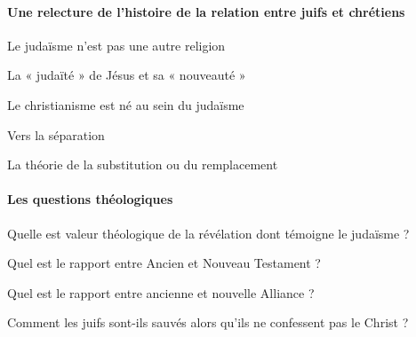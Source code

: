   
    
    \paragraph{Une relecture de l'histoire de la relation entre juifs et
    chrétiens}
    

    
    \def\labelenumiii{\alph{enumiii}.}
    
      
      Le judaïsme n'est pas une autre religion
      
    
      
      La « judaïté » de Jésus et sa « nouveauté »
      
    
      
      Le christianisme est né au sein du judaïsme
      
    
      
      Vers la séparation
      
    
      
      La théorie de la substitution ou du remplacement
      
    
  
    
    \paragraph{Les questions théologiques}
    

    
    \def\labelenumiii{\alph{enumiii}.}
    
      
      Quelle est valeur théologique de la révélation dont témoigne le
      judaïsme ?
      
    
      
      Quel est le rapport entre Ancien et Nouveau Testament ?
      
    
      
      Quel est le rapport entre ancienne et nouvelle Alliance ?
      
    
      
      Comment les juifs sont-ils sauvés alors qu'ils ne confessent pas
      le Christ ?
      
    
  

